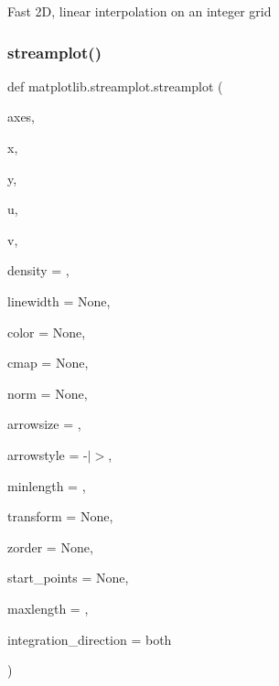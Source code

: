 \begin{DoxyVerb}Fast 2D, linear interpolation on an integer grid\end{DoxyVerb}
 \mbox{\label{namespacematplotlib_1_1streamplot_a3a50c1d3e0dc4a5f7fe29905972e80f6}} 
\subsubsection{\texorpdfstring{streamplot()}{streamplot()}}
{\footnotesize\ttfamily def matplotlib.\+streamplot.\+streamplot (\begin{DoxyParamCaption}\item[{}]{axes,  }\item[{}]{x,  }\item[{}]{y,  }\item[{}]{u,  }\item[{}]{v,  }\item[{}]{density = {},  }\item[{}]{linewidth = {\ttfamily None},  }\item[{}]{color = {\ttfamily None},  }\item[{}]{cmap = {\ttfamily None},  }\item[{}]{norm = {\ttfamily None},  }\item[{}]{arrowsize = {},  }\item[{}]{arrowstyle = {\ttfamily \textquotesingle{}-\/$\vert$$>$\textquotesingle{}},  }\item[{}]{minlength = {},  }\item[{}]{transform = {\ttfamily None},  }\item[{}]{zorder = {\ttfamily None},  }\item[{}]{start\+\_\+points = {\ttfamily None},  }\item[{}]{maxlength = {},  }\item[{}]{integration\+\_\+direction = {\ttfamily \textquotesingle{}both\textquotesingle{}} }\end{DoxyParamCaption})}


